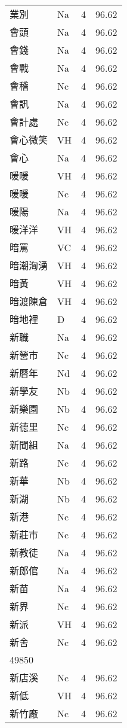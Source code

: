 \documentclass[twocolumn]{book}
\begin{document}
\begin{supertabular}{llrr}
業別 & Na & 4 &  96.62\\
會頭 & Na & 4 &  96.62\\
會錢 & Na & 4 &  96.62\\
會戰 & Na & 4 &  96.62\\
會稽 & Nc & 4 &  96.62\\
會訊 & Na & 4 &  96.62\\
會計處 & Nc & 4 &  96.62\\
會心微笑 & VH & 4 &  96.62\\
會心 & Na & 4 &  96.62\\
暖暖 & VH & 4 &  96.62\\
暖暖 & Nc & 4 &  96.62\\
暖陽 & Na & 4 &  96.62\\
暖洋洋 & VH & 4 &  96.62\\
暗罵 & VC & 4 &  96.62\\
暗潮洶湧 & VH & 4 &  96.62\\
暗黃 & VH & 4 &  96.62\\
暗渡陳倉 & VH & 4 &  96.62\\
暗地裡 & D & 4 &  96.62\\
新職 & Na & 4 &  96.62\\
新營市 & Nc & 4 &  96.62\\
新曆年 & Nd & 4 &  96.62\\
新學友 & Nb & 4 &  96.62\\
新樂園 & Nb & 4 &  96.62\\
新德里 & Nc & 4 &  96.62\\
新聞組 & Na & 4 &  96.62\\
新路 & Nc & 4 &  96.62\\
新華 & Nb & 4 &  96.62\\
新湖 & Nb & 4 &  96.62\\
新港 & Nc & 4 &  96.62\\
新莊市 & Nc & 4 &  96.62\\
新教徒 & Na & 4 &  96.62\\
新郎倌 & Na & 4 &  96.62\\
新苗 & Na & 4 &  96.62\\
新界 & Nc & 4 &  96.62\\
新派 & VH & 4 &  96.62\\
新舍 & Nc & 4 &  96.62\\
49850\\
新店溪 & Nc & 4 &  96.62\\
新低 & VH & 4 &  96.62\\
新竹廠 & Nc & 4 &  96.62\\

\end{supertabular}
\end{document}
